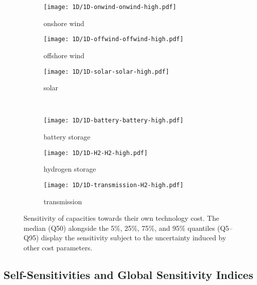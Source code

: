 \begin{figure}
    \begin{subfigure}[t]{0.32\textwidth}
        \caption{onshore wind}
        \texttt{[image: 1D/1D-onwind-onwind-high.pdf]}
    \end{subfigure}
    \begin{subfigure}[t]{0.32\textwidth}
        \caption{offshore wind}
        \texttt{[image: 1D/1D-offwind-offwind-high.pdf]}
    \end{subfigure}
    \begin{subfigure}[t]{0.32\textwidth}
        \caption{solar}
        \texttt{[image: 1D/1D-solar-solar-high.pdf]}
    \end{subfigure} \\
    \begin{subfigure}[t]{0.32\textwidth}
        \caption{battery storage}
        \texttt{[image: 1D/1D-battery-battery-high.pdf]}
    \end{subfigure}
    \begin{subfigure}[t]{0.32\textwidth}
        \caption{hydrogen storage}
        \texttt{[image: 1D/1D-H2-H2-high.pdf]}
    \end{subfigure}
    \begin{subfigure}[t]{0.32\textwidth}
        \caption{transmission}
        \texttt{[image: 1D/1D-transmission-H2-high.pdf]}
    \end{subfigure}
    \caption{
      Sensitivity of capacities towards their own technology cost.
      The median (Q50) alongside the 5\%, 25\%, 75\%, and 95\% quantiles (Q5--Q95) display
      the sensitivity subject to the uncertainty induced by other cost parameters.
    }
    \label{fig:sensitivity}
\end{figure}

\subsection{Self-Sensitivities and Global Sensitivity Indices}

